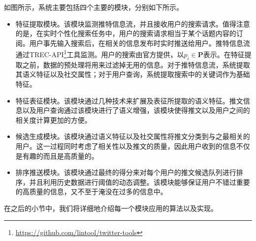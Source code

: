 如图所示，系统主要包括四个主要的模块，分别如下所示。
\begin{itemize}
  \item 特征提取模块。该模块监测推特信息流，并且接收用户的搜索请求。值得注意的是，在实时个性化搜索任务中，用户的搜索请求相当于某个话题内容的订阅。用户事先输入搜索后，在相关的信息发布时实时推送给用户。推特信息流通过TREC-API\footnote{\url{https://github.com/lintool/twitter-tools}}工具监测。用户的搜索由官方提供，以$p_i \in \textbf{P}$表示。在特征提取之前，数据的预处理将用来过滤掉无用的信息。对于推特信息流，系统提取其语义特征以及社交属性；对于用户查询，系统提取搜索中的关键词作为基础特征。
  \item 特征表征模块。该模块通过几种技术来扩展及表征所提取的语义特征。推文信息以及用户查询通过该模块进行了语义增强，该模块使得推文以及用户之间的相关度计算更加的方便。
  \item 候选生成模块。该模块通过语义特征以及社交属性将推文分类到与之最相关的用户。这一过程同时考虑了相关性以及推文的质量，因此用户收到的信息不仅是有趣的而且是高质量的。
  \item 排序推送模块。该模块通过最终的得分来对每个用户的推文候选队列进行排序，并且利用历史数据进行阈值的动态调整。该模块能够保证用户不错过重要的高质量的信息，又不至于淹没在过多的信息中。
\end{itemize}

在之后的小节中，我们将详细地介绍每一个模块应用的算法以及实现。

